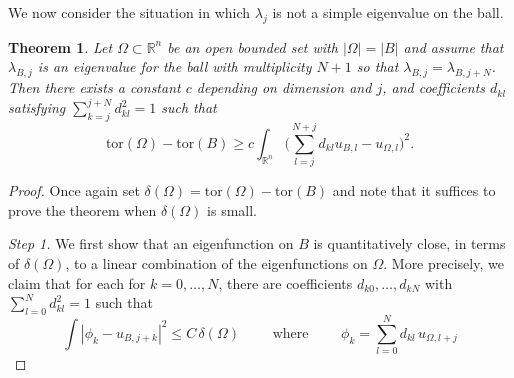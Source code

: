 \documentclass[10pt, reqno]{amsart}
\numberwithin{equation}{section}
\newtheorem{theorem}{Theorem}[section]
\def\W{\Omega}
\def\tor{\mathrm{tor}}
\begin{document}
We now consider the situation in which $\lambda_j$ is not a simple eigenvalue on the ball. 
\begin{theorem} \label{t:third}
 Let $\W\subset \mathbb{R}^n$ be an open bounded set with $|\W|=|B|$ and assume that $\lambda_{B,j}$ is an  eigenvalue for the ball with multiplicity $N+1$ so that $\lambda_{B,j}=\lambda_{B,j+N}$. 
 Then there exists a constant $c$ depending on dimension and $j$, and coefficients $d_{kl}$ satisfying $\sum_{k=j}^{j+N} d_{kl}^2=1$ such that 
 \[
 \tor(\W)-\tor(B) \geq c \int_{\mathbb{R}^n} \Big(\sum_{l=j}^{N+j}d_{kl} u_{B,l}- u_{\W,l}\Big)^2. 
 \]
\end{theorem}
\begin{proof}
Once again set $\delta(\W)=\tor(\W)-\tor(B)$ and note that it suffices to prove the theorem when $\delta(\W)$ is small.


{\it Step 1.} We first show that an eigenfunction on $B$ is quantitatively close, in terms of $\delta(\W)$, to a linear combination of the eigenfunctions on $\W$. More precisely, we claim that for each for $k=0,\dots, N$, there are coefficients $d_{k0}, \dots, d_{kN}$ with $\sum_{l=0}^N d_{kl}^2 =1$ such that  
\begin{equation}
    \label{e}
\int |\phi_{k} - u_{B,j+k}|^2 \leq C \,\delta(\W ) \qquad \text{ where } \qquad \phi_k = \sum_{l=0}^N d_{kl}\,  u_{\W,l+j}
\end{equation}


\end{proof}
\end{document}

